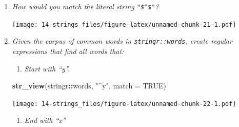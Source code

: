 \documentclass[]{book}
\newenvironment{Shaded}{\begin{snugshade}}{\end{snugshade}}
\newcommand{\CharTok}[1]{\textcolor[rgb]{0.31,0.60,0.02}{#1}}
\newcommand{\DataTypeTok}[1]{\textcolor[rgb]{0.13,0.29,0.53}{#1}}
\newcommand{\KeywordTok}[1]{\textcolor[rgb]{0.13,0.29,0.53}{\textbf{#1}}}
\newcommand{\NormalTok}[1]{#1}
\newcommand{\OperatorTok}[1]{\textcolor[rgb]{0.81,0.36,0.00}{\textbf{#1}}}
\newcommand{\OtherTok}[1]{\textcolor[rgb]{0.56,0.35,0.01}{#1}}
\newcommand{\StringTok}[1]{\textcolor[rgb]{0.31,0.60,0.02}{#1}}
\providecommand{\tightlist}{%
  \setlength{\itemsep}{0pt}\setlength{\parskip}{0pt}}
\theoremstyle{definition}
\theoremstyle{definition}
\theoremstyle{definition}
\theoremstyle{remark}
\begin{document}
\begin{enumerate}
\def\labelenumi{\arabic{enumi}.}
\item
  \emph{How would you match the literal string \texttt{"\$\^{}\$"}?}

\begin{Shaded}
\end{Shaded}

  \texttt{[image: 14-strings\_files/figure-latex/unnamed-chunk-21-1.pdf]}
\item
  \emph{Given the corpus of common words in \texttt{stringr::words},
  create regular} \emph{expressions that find all words that:}

  \begin{enumerate}
  \def\labelenumii{\arabic{enumii}.}
  \tightlist
  \item
    \emph{Start with ``y''.}
  \end{enumerate}

\begin{Shaded}
\begin{Highlighting}[]
\KeywordTok{str_view}\NormalTok{(stringr}\OperatorTok{::}\NormalTok{words, }\StringTok{"^y"}\NormalTok{, }\DataTypeTok{match =} \OtherTok{TRUE}\NormalTok{)}
\end{Highlighting}
\end{Shaded}

  \texttt{[image: 14-strings\_files/figure-latex/unnamed-chunk-22-1.pdf]}

  \begin{enumerate}
  \def\labelenumii{\arabic{enumii}.}
  \setcounter{enumii}{1}
  \tightlist
  \item
    \emph{End with ``x''}
  \end{enumerate}

\begin{Shaded}
\end{Shaded}


\end{enumerate}
\end{document}
